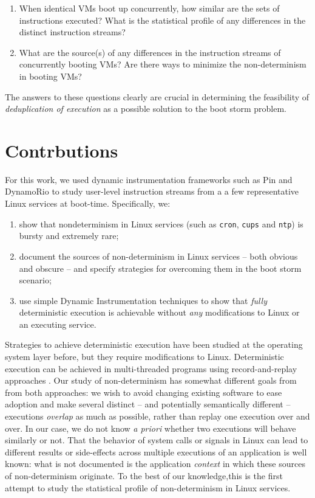 \begin{enumerate}

\item When identical VMs boot up concurrently, how similar
are the sets of instructions executed? What is the statistical
profile of any differences in the distinct instruction streams?

\item What are the source(s) of any differences in
the instruction streams of concurrently booting VMs?
Are there ways to minimize the non-determinism in
booting VMs?

\end{enumerate}

The answers to these questions clearly are crucial in determining
the feasibility of \emph{deduplication of execution} as a possible solution
to the boot storm problem. 

\section{Contrbutions}
For this work, we used dynamic instrumentation frameworks such as Pin \cite{luk2005pin} and
DynamoRio \cite{bruening2004dr} to study user-level instruction streams from a
a few representative Linux services at boot-time. 
Specifically, we:

\begin {enumerate}
\item show that nondeterminism in Linux services (such as \texttt{cron}, \texttt{cups} and \texttt{ntp}) 
  is bursty and extremely rare;
\item document the sources of non-determinism in Linux services -- both obvious and obscure --
  and specify strategies for overcoming them in the boot storm scenario;
\item use simple Dynamic Instrumentation techniques to show that \emph{fully} deterministic execution is achievable
  without \emph{any} modifications to Linux or an executing service.
\end {enumerate}

Strategies to achieve deterministic execution have been studied at the operating system layer \cite{bergan2010dos} before,
but they require modifications to Linux. Deterministic execution can be achieved in multi-threaded programs 
using record-and-replay approaches \cite{marek2011scaling, patil2010pinplay}. Our study of non-determinism has somewhat different goals from 
from both approaches: we wish to avoid changing existing software to ease adoption and make 
several distinct -- and potentially semantically different -- executions \emph{overlap} as much as possible, 
rather than replay one execution over and over. In our case, we do not know \emph{a priori} whether two executions 
will behave similarly or not. That the behavior of system calls or signals in Linux can lead to different results or side-effects across
multiple executions of an application is well known: what is not documented is the application \emph{context} in
which these sources of non-determinism originate. To the best of our knowledge,this is
the first attempt to study the statistical profile of non-determinism in Linux services.


